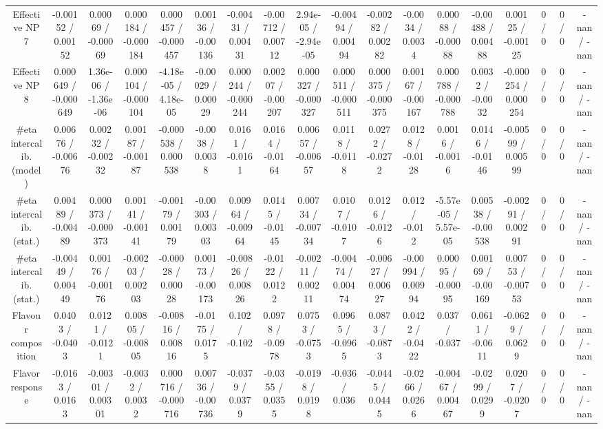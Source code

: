 \documentclass[10pt]{article}
\begin{document}
\begin{table}[htbp]
\begin{center}
\begin{tabular}{|c|c|c|c|c|c|c|c|c|c|c|c|c|c|c|c|c|c|}
  Effective NP 7 & -0.00152 / 0.00152 & 0.00069 / -0.00069 & 0.000184 / -0.000184 & 0.000457 / -0.000457 & 0.00136 / -0.00136 & -0.00431 / 0.00431 & -0.00712 / 0.00712 & 2.94e-05 / -2.94e-05 & -0.00494 / 0.00494 & -0.00282 / 0.00282 & -0.0034 / 0.0034 & 0.00088 / -0.00088 & -0.00488 / 0.00488 & 0.00125 / -0.00125 & 0 / 0 & 0 / 0 & -nan / -nan \\ 
  Effective NP 8 & 0.000649 / -0.000649 & 1.36e-06 / -1.36e-06 & 0.000104 / -0.000104 & -4.18e-05 / 4.18e-05 & -0.00029 / 0.00029 & 0.000244 / -0.000244 & 0.00207 / -0.00207 & 0.000327 / -0.000327 & 0.000511 / -0.000511 & 0.000375 / -0.000375 & 0.00167 / -0.00167 & 0.000788 / -0.000788 & 0.0032 / -0.0032 & -0.000254 / 0.000254 & 0 / 0 & 0 / 0 & -nan / -nan \\ 
  #eta intercalib. (model) & 0.00676 / -0.00676 & 0.00232 / -0.00232 & 0.00187 / -0.00187 & -0.000538 / 0.000538 & -0.0038 / 0.0038 & 0.0161 / -0.0161 & 0.0164 / -0.0164 & 0.00657 / -0.00657 & 0.0118 / -0.0118 & 0.0272 / -0.0272 & 0.0128 / -0.0128 & 0.0016 / -0.0016 & 0.0146 / -0.0146 & -0.00599 / 0.00599 & 0 / 0 & 0 / 0 & -nan / -nan \\ 
  #eta intercalib. (stat.) & 0.00489 / -0.00489 & 0.000373 / -0.000373 & 0.00141 / -0.00141 & -0.00179 / 0.00179 & -0.00303 / 0.00303 & 0.00964 / -0.00964 & 0.0145 / -0.0145 & 0.00734 / -0.00734 & 0.0107 / -0.0107 & 0.0126 / -0.0126 & 0.012 / -0.012 & -5.57e-05 / 5.57e-05 & 0.00538 / -0.00538 & -0.00291 / 0.00291 & 0 / 0 & 0 / 0 & -nan / -nan \\ 
  #eta intercalib. (stat.) & -0.00449 / 0.00449 & 0.00176 / -0.00176 & -0.00203 / 0.00203 & -0.00028 / 0.00028 & 0.00173 / -0.00173 & -0.00826 / 0.00826 & -0.0122 / 0.0122 & -0.00211 / 0.00211 & -0.00474 / 0.00474 & -0.00627 / 0.00627 & -0.00994 / 0.00994 & 0.00095 / -0.00095 & 0.00169 / -0.00169 & 0.00753 / -0.00753 & 0 / 0 & 0 / 0 & -nan / -nan \\ 
  Flavour composition & 0.0403 / -0.0403 & 0.0121 / -0.0121 & 0.00805 / -0.00805 & -0.00816 / 0.00816 & -0.0175 / 0.0175 & 0.102 / -0.102 & 0.0978 / -0.0978 & 0.0753 / -0.0753 & 0.0965 / -0.0965 & 0.0873 / -0.0873 & 0.0422 / -0.0422 & 0.037 / -0.037 & 0.0611 / -0.0611 & -0.0629 / 0.0629 & 0 / 0 & 0 / 0 & -nan / -nan \\ 
  Flavor response & -0.0163 / 0.0163 & -0.00301 / 0.00301 & -0.0032 / 0.0032 & 0.000716 / -0.000716 & 0.00736 / -0.00736 & -0.0379 / 0.0379 & -0.0355 / 0.0355 & -0.0198 / 0.0198 & -0.036 / 0.036 & -0.0445 / 0.0445 & -0.0266 / 0.0266 & -0.00467 / 0.00467 & -0.0299 / 0.0299 & 0.0207 / -0.0207 & 0 / 0 & 0 / 0 & -nan / -nan \\ 

\end{tabular}
\end{center}
\end{table}
\end{document}
